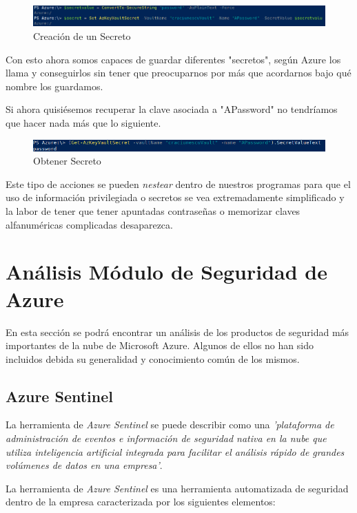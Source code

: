\documentclass{article}
\begin{document}
\begin{figure}[h!]
    \includegraphics[width=\linewidth]{./Selection_012.png}
    \caption{Creación de un Secreto}
\end{figure}

Con esto ahora somos capaces de guardar diferentes "secretos", según Azure los
llama y conseguirlos sin tener que preocuparnos por más que acordarnos bajo qué
nombre los guardamos.

Si ahora quisiésemos recuperar la clave asociada a "APassword" no tendríamos que
hacer nada más que lo siguiente.

\begin{figure}[h!]
    \includegraphics[width=\linewidth]{./Selection_013.png}
    \caption{Obtener Secreto}
\end{figure}

Este tipo de acciones se pueden \textit{nestear} dentro de nuestros programas
para que el uso de información privilegiada o secretos se vea extremadamente
simplificado y la labor de tener que tener apuntadas contraseñas o memorizar
claves alfanuméricas complicadas desaparezca.

\section*{Análisis Módulo de Seguridad de Azure}

En esta sección se podrá encontrar un análisis de los productos de seguridad más
importantes de la nube de Microsoft Azure. Algunos de ellos no han
sido incluidos debida su generalidad y conocimiento común de los mismos. 

\subsection*{Azure Sentinel}

La herramienta de \textit{Azure Sentinel} se puede describir como una
\textit{'plataforma de administración de eventos e información de seguridad
nativa en la nube que utiliza inteligencia artificial integrada para facilitar
el análisis rápido de grandes volúmenes de datos en una empresa'}. 

La herramienta de \textit{Azure Sentinel} es una herramienta automatizada de seguridad dentro
de la empresa caracterizada por los siguientes elementos:
\end{document}
